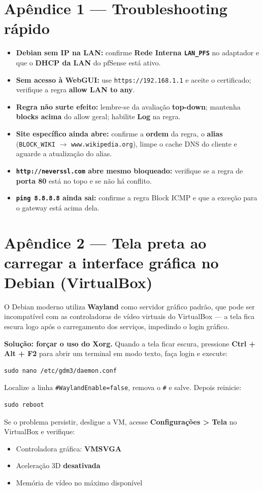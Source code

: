 \section*{Apêndice 1 --- Troubleshooting rápido}

\begin{itemize}
  \item \textbf{Debian sem IP na LAN:} confirme \textbf{Rede Interna \texttt{LAN\_PFS}} no adaptador e que o \textbf{DHCP da LAN} do pfSense está ativo.
  \item \textbf{Sem acesso à WebGUI:} use \texttt{https://192.168.1.1} e aceite o certificado; verifique a regra \textbf{allow LAN to any}.
  \item \textbf{Regra não surte efeito:} lembre-se da avaliação \textbf{top-down}; mantenha \textbf{blocks acima} do allow geral; habilite \textbf{Log} na regra.
  \item \textbf{Site específico ainda abre:} confirme a \textbf{ordem} da regra, o \textbf{alias} (\texttt{BLOCK\_WIKI} $\rightarrow$ \texttt{www.wikipedia.org}), limpe o cache DNS do cliente e aguarde a atualização do alias.
  \item \textbf{\texttt{http://neverssl.com} abre mesmo bloqueado:} verifique se a regra de \textbf{porta 80} está no topo e se não há conflito.
  \item \textbf{\texttt{ping 8.8.8.8} ainda sai:} confirme a regra Block ICMP e que a exceção para o gateway está acima dela.
\end{itemize}

\section*{Apêndice 2 --- Tela preta ao carregar a interface gráfica no Debian (VirtualBox)}

O Debian moderno utiliza \textbf{Wayland} como servidor gráfico padrão, que pode ser incompatível com as controladoras de vídeo virtuais do VirtualBox --- a tela fica escura logo após o carregamento dos serviços, impedindo o login gráfico.

\textbf{Solução: forçar o uso do Xorg.} Quando a tela ficar escura, pressione \textbf{Ctrl + Alt + F2} para abrir um terminal em modo texto, faça login e execute:
\begin{lstlisting}
sudo nano /etc/gdm3/daemon.conf
\end{lstlisting}
Localize a linha \texttt{\#WaylandEnable=false}, remova o \texttt{\#} e salve. Depois reinicie:
\begin{lstlisting}
sudo reboot
\end{lstlisting}

Se o problema persistir, desligue a VM, acesse \textbf{Configurações > Tela} no VirtualBox e verifique:
\begin{itemize}
  \item Controladora gráfica: \textbf{VMSVGA}
  \item Aceleração 3D \textbf{desativada}
  \item Memória de vídeo no máximo disponível
\end{itemize}


